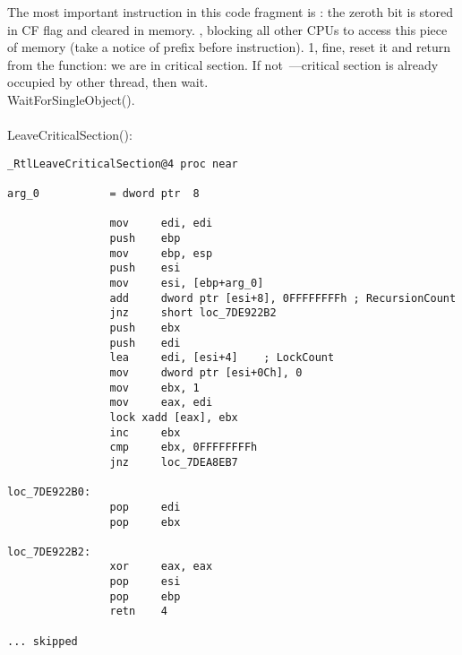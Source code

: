 {The most important instruction in this code fragment is} : 
{the zeroth bit is stored in CF flag and cleared in memory}.
, 
{blocking all other CPUs to access this piece of memory 
(take a notice of  prefix before  instruction).}
   1, 
{fine, reset it and return from the function: we are in critical section}.
{If not~---critical section is already occupied by other thread, then wait}. \\
 WaitForSingleObject(). \\
\\
 LeaveCriticalSection():

\begin{lstlisting}[caption=Windows 2008/ntdll.dll/x86 (begin)]
_RtlLeaveCriticalSection@4 proc near

arg_0           = dword ptr  8

                mov     edi, edi
                push    ebp
                mov     ebp, esp
                push    esi
                mov     esi, [ebp+arg_0]
                add     dword ptr [esi+8], 0FFFFFFFFh ; RecursionCount
                jnz     short loc_7DE922B2
                push    ebx
                push    edi
                lea     edi, [esi+4]    ; LockCount
                mov     dword ptr [esi+0Ch], 0
                mov     ebx, 1
                mov     eax, edi
                lock xadd [eax], ebx
                inc     ebx
                cmp     ebx, 0FFFFFFFFh
                jnz     loc_7DEA8EB7

loc_7DE922B0:
                pop     edi
                pop     ebx

loc_7DE922B2:
                xor     eax, eax
                pop     esi
                pop     ebp
                retn    4

... skipped
\end{lstlisting}

